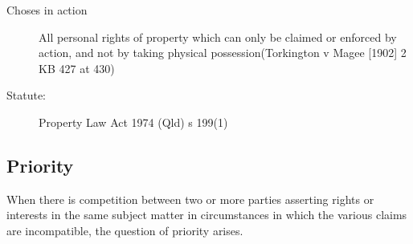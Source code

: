 \begin{itemize}
\begin{itemize}
\begin{itemize}
\begin{description}
                            \item[Choses in action]All personal rights of property which can only be claimed or enforced by action, and not by taking physical possession(Torkington v Magee [1902] 2 KB 427 at 430)
                            \item[Statute:]Property Law Act 1974 (Qld) s 199(1) 
                        \end{description}
                \end{itemize}
        \end{itemize}
\end{itemize}

\subsection*{Priority}
When there is competition between two or more parties asserting rights or interests in the same subject matter in circumstances in which the various claims are incompatible, the question of priority arises.
